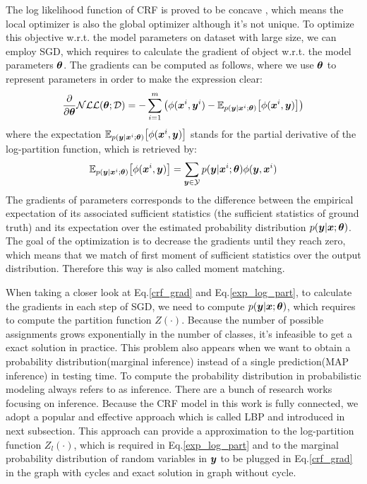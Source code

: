 The log likelihood function of \gls{CRF} is proved to be concave \cite{koller2009probabilistic}, which means the local optimizer is also the global optimizer although it's not unique. To optimize this objective w.r.t. the model parameters on dataset with large size, we can employ \gls{SGD}, which requires to calculate the gradient of object w.r.t. the model parameters $\boldsymbol \theta$. The gradients can be computed as follows, where we use $\boldsymbol \theta$ to represent parameters in order to make the expression clear:
\begin{equation}
\label{crf_grad}
\frac{\partial}{\partial \boldsymbol \theta} \mathcal{NLL}(\boldsymbol \theta; \mathcal{D}) = -\sum_{i=1}^{m}
\big(
\phi(\boldsymbol x^i, \boldsymbol y^i) - 
\mathbb{E}_{p(\boldsymbol y|\boldsymbol x^i;\boldsymbol \theta)}
\big[\phi(\boldsymbol x^i, \boldsymbol y)\big]
\big)
\end{equation}
where the expectation $\mathbb{E}_{p(\boldsymbol y|\boldsymbol x^i;\boldsymbol \theta)}
\big[\phi(\boldsymbol x^i, \boldsymbol y)\big]$ stands for the partial derivative of the log-partition function, which is retrieved by:
\begin{equation}
\label{exp_log_part}
\mathbb{E}_{p(\boldsymbol y|\boldsymbol x^i;\boldsymbol \theta)}
\big[\phi(\boldsymbol x^i, \boldsymbol y)\big] = \sum_{\boldsymbol y\in\mathcal{Y}}p(\boldsymbol y|\boldsymbol x^i;\boldsymbol \theta)\phi(\boldsymbol y, \boldsymbol x^i)
\end{equation}
The gradients of parameters corresponds to the difference between the empirical expectation of its associated sufficient statistics (the sufficient statistics of ground truth) and its expectation over the estimated probability distribution $p(\boldsymbol y|\boldsymbol x; \boldsymbol \theta)$. The goal of the optimization is to decrease the gradients until they reach zero, which means that we match of first moment of sufficient statistics over the output distribution. Therefore this way is also called moment matching.

When taking a closer look at Eq.\ref{crf_grad} and Eq.\ref{exp_log_part}, to calculate the gradients in each step of \gls{SGD}, we need to compute $p(\boldsymbol y|\boldsymbol x; \boldsymbol \theta)$, which requires to compute the partition function $Z(\cdot)$. Because the number of possible assignments grows exponentially in the number of classes, it's infeasible to get a exact solution in practice. This problem also appears when we want to obtain a probability distribution(marginal inference) instead of a single prediction(MAP inference) in testing time. To compute the probability distribution in probabilistic modeling always refers to as inference. There are a bunch of research works focusing on inference. Because the \gls{CRF} model in this work is fully connected, we adopt a popular and effective approach which is called \gls{LBP} and introduced in next subsection. This approach can provide a approximation to the log-partition function $Z_l(\cdot)$, which is required in Eq.\ref{exp_log_part} and to the marginal probability distribution of random variables in $\boldsymbol y$ to be plugged in Eq.\ref{crf_grad} in the graph with cycles and exact solution in graph without cycle.


